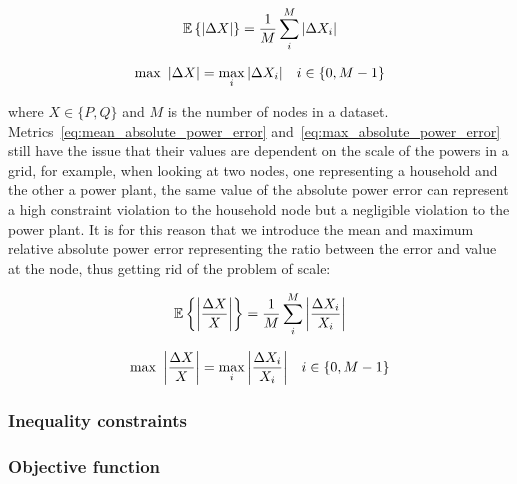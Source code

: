 \begin{equation}
    \label{eq:mean_absolute_power_error}
    \mathbb{E} \left\{\left| \Delta X \right|\right\} = \frac{1}{M} \sum_i^{M} \left| \Delta X_i \right|
\end{equation}

\begin{equation}
    \label{eq:max_absolute_power_error}
    \max \ \left| \Delta X \right| = \max_i{\left| \Delta X_i \right|} \quad i \in \{0, M - 1\}
\end{equation}

\noindent where $X \in \{P, Q\}$ and $M$ is the number of nodes in a dataset. \\

Metrics~\ref{eq:mean_absolute_power_error} and~\ref{eq:max_absolute_power_error} still
have the issue that their values are dependent on the scale of the powers in a grid, for example,
when looking at two nodes, one representing a household and the other a power plant, the same
value of the absolute power error can represent a high constraint violation to the household
node but a negligible violation to the power plant.
It is for this reason that we introduce the mean and maximum relative absolute power error representing
the ratio between the error and value at the node, thus getting rid of the problem of scale:

\begin{equation}
    \label{eq:mean_relative_absolute_power_error}
    \mathbb{E} \left\{\left| \frac{\Delta X}{X} \right|\right\} = \frac{1}{M} \sum_i^{M} \left| \frac{\Delta X_i}{X_i} \right|
\end{equation}

\begin{equation}
    \label{eq:max_relative_absolute_power_error}
    \max \ \left| \frac{\Delta X}{X} \right| = \max_i{\left| \frac{\Delta X_i}{X_i} \right|} \quad i \in \{0, M - 1\}
\end{equation}

\subsubsection*{Inequality constraints}
\subsubsection*{Objective function}